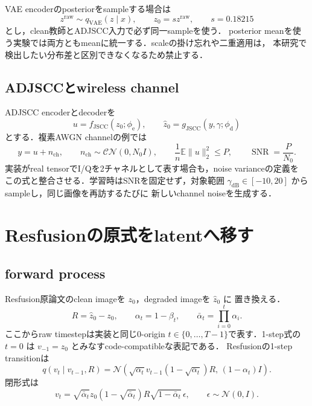 \documentclass[11pt,a4paper]{ltjsarticle}
\newcommand{\E}{\mathbb{E}}
\newcommand{\N}{\mathcal{N}}
\newcommand{\CN}{\mathcal{CN}}
\newcommand{\snr}{\operatorname{SNR}}
\begin{document}
VAE encoderのposteriorをsampleする場合は
\[
  z^{\mathrm{raw}}\sim q_{\mathrm{VAE}}(z\mid x),
  \qquad z_0=s z^{\mathrm{raw}},\qquad s=0.18215
\]
とし，clean教師とADJSCC入力で必ず同一sampleを使う．
posterior meanを使う実験では両方ともmeanに統一する．scaleの掛け忘れや二重適用は，
本研究で検出したい分布差と区別できなくなるため禁止する．

\subsection{ADJSCCとwireless channel}

ADJSCC encoderとdecoderを
\[
  u=f_{\mathrm{JSCC}}(z_0;\phi_{\mathrm e}),\qquad
  \hat z_0=g_{\mathrm{JSCC}}(y,\gamma;\phi_{\mathrm d})
\]
とする．複素AWGN channelの例では
\[
  y=u+n_{\mathrm{ch}},\qquad
  n_{\mathrm{ch}}\sim\CN(0,N_0 I),\qquad
  \frac{1}{n}\E\lVert u\rVert_2^2\le P,\qquad
  \snr=\frac{P}{N_0}.
\]
実装がreal tensorでI/Qを2チャネルとして表す場合も，noise varianceの定義を
この式と整合させる．学習時はSNRを固定せず，対象範囲
\(\gamma_{\mathrm{dB}}\in[-10,20]\) からsampleし，同じ画像を再訪するたびに
新しいchannel noiseを生成する．

\section{Resfusionの原式をlatentへ移す}

\subsection{forward process}

Resfusion原論文\cite{resfusion}のclean imageを \(z_0\)，degraded imageを \(\hat z_0\) に
置き換える．
\[
  R=\hat z_0-z_0,\qquad
  \alpha_t=1-\beta_t,\qquad
  \bar\alpha_t=\prod_{i=0}^{t}\alpha_i .
\]
ここからraw timestepは実装と同じ0-origin
\(t\in\{0,\ldots,T-1\}\)で表す．1-step式の \(t=0\) は
\(v_{-1}=z_0\) とみなすcode-compatibleな表記である．
Resfusionの1-step transitionは
\begin{equation}
q(v_t\mid v_{t-1},R)
=
\N\!\left(
  \sqrt{\alpha_t}v_{t-1}
  (1-\sqrt{\alpha_t})R,\,
  (1-\alpha_t)I
\right).
\label{eq:resfusion-transition}
\end{equation}
閉形式は
\begin{equation}
  v_t
  =
  \sqrt{\bar\alpha_t}z_0
  (1-\sqrt{\bar\alpha_t})R
  \sqrt{1-\bar\alpha_t}\,\epsilon,
  \qquad \epsilon\sim\N(0,I).
\label{eq:resfusion-forward}
\end{equation}
\end{document}
